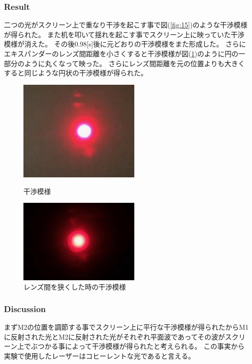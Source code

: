 \documentclass[11pt, a4paper]{jsarticle}
\begin{document}
\subsubsection{Result}
二つの光がスクリーン上で重なり干渉を起こす事で図(\ref{fig:15})のような干渉模様が得られた。
また机を叩いて揺れを起こす事でスクリーン上に映っていた干渉模様が消えた。
その後0.98[s]後に元どおりの干渉模様をまた形成した。
さらにエキスパンダーのレンズ間距離を小さくすると干渉模様が図(\ref{fig:16})のように円の一部分のように丸くなって映った。
さらにレンズ間距離を元の位置よりも大きくすると同じような円状の干渉模様が得られた。
\newpage

\begin{figure}[htbp]
 \begin{minipage}{0.45\hsize}
  \begin{center}
   \includegraphics[width=60mm]{fig15.png}
  \end{center}
  \caption{干渉模様}
  \label{fig:15}
 \end{minipage}
 \begin{minipage}{0.45\hsize}
  \begin{center}
   \includegraphics[width=60mm]{fig16.png}
  \end{center}
  \caption{レンズ間を狭くした時の干渉模様}
  \label{fig:16}
 \end{minipage}
\end{figure}

\subsubsection{Discussion}
まずM2の位置を調節する事でスクリーン上に平行な干渉模様が得られたからM1に反射された光とM2に反射された光がそれぞれ平面波であってその波がスクリーン上でぶつかる事によって干渉模様が得られたと考えられる。
この事実から実験で使用したレーザーはコヒーレントな光であると言える。
\end{document}
